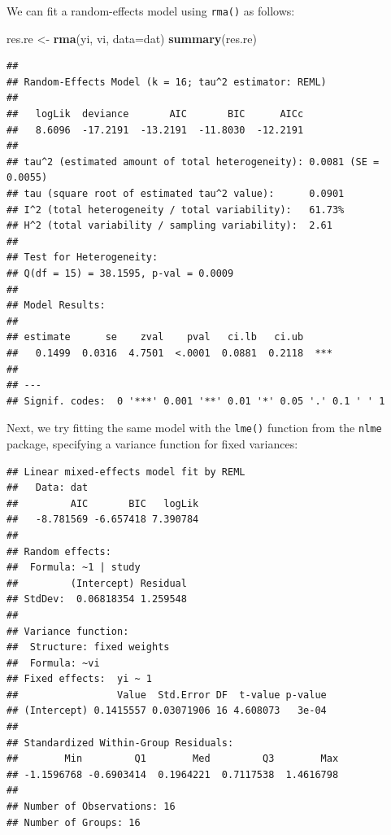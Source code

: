 \documentclass[
]{book}
\newenvironment{Shaded}{\begin{snugshade}}{\end{snugshade}}
\newcommand{\AttributeTok}[1]{\textcolor[rgb]{0.13,0.29,0.53}{#1}}
\newcommand{\DecValTok}[1]{\textcolor[rgb]{0.00,0.00,0.81}{#1}}
\newcommand{\FunctionTok}[1]{\textcolor[rgb]{0.13,0.29,0.53}{\textbf{#1}}}
\newcommand{\NormalTok}[1]{#1}
\newcommand{\OtherTok}[1]{\textcolor[rgb]{0.56,0.35,0.01}{#1}}
\newcommand{\SpecialCharTok}[1]{\textcolor[rgb]{0.81,0.36,0.00}{\textbf{#1}}}
\begin{document}
We can fit a random-effects model using \texttt{rma()} as follows:

\begin{Shaded}
\begin{Highlighting}[]
\NormalTok{res.re }\OtherTok{\textless{}{-}} \FunctionTok{rma}\NormalTok{(yi, vi, }\AttributeTok{data=}\NormalTok{dat)}
\FunctionTok{summary}\NormalTok{(res.re)}
\end{Highlighting}
\end{Shaded}

\begin{verbatim}
## 
## Random-Effects Model (k = 16; tau^2 estimator: REML)
## 
##   logLik  deviance       AIC       BIC      AICc   
##   8.6096  -17.2191  -13.2191  -11.8030  -12.2191   
## 
## tau^2 (estimated amount of total heterogeneity): 0.0081 (SE = 0.0055)
## tau (square root of estimated tau^2 value):      0.0901
## I^2 (total heterogeneity / total variability):   61.73%
## H^2 (total variability / sampling variability):  2.61
## 
## Test for Heterogeneity:
## Q(df = 15) = 38.1595, p-val = 0.0009
## 
## Model Results:
## 
## estimate      se    zval    pval   ci.lb   ci.ub      
##   0.1499  0.0316  4.7501  <.0001  0.0881  0.2118  *** 
## 
## ---
## Signif. codes:  0 '***' 0.001 '**' 0.01 '*' 0.05 '.' 0.1 ' ' 1
\end{verbatim}

Next, we try fitting the same model with the \texttt{lme()} function from the \texttt{nlme} package, specifying a variance function for fixed variances:

\begin{Shaded}
\end{Shaded}

\begin{verbatim}
## Linear mixed-effects model fit by REML
##   Data: dat 
##         AIC       BIC   logLik
##   -8.781569 -6.657418 7.390784
## 
## Random effects:
##  Formula: ~1 | study
##         (Intercept) Residual
## StdDev:  0.06818354 1.259548
## 
## Variance function:
##  Structure: fixed weights
##  Formula: ~vi 
## Fixed effects:  yi ~ 1 
##                 Value  Std.Error DF  t-value p-value
## (Intercept) 0.1415557 0.03071906 16 4.608073   3e-04
## 
## Standardized Within-Group Residuals:
##        Min         Q1        Med         Q3        Max 
## -1.1596768 -0.6903414  0.1964221  0.7117538  1.4616798 
## 
## Number of Observations: 16
## Number of Groups: 16
\end{verbatim}
\end{document}
